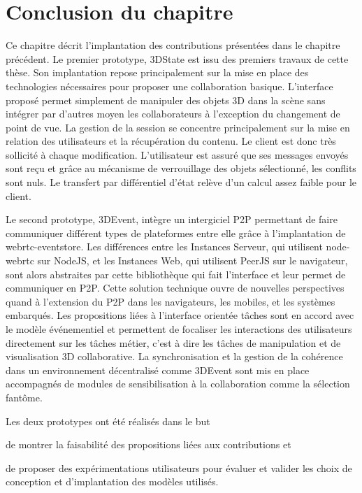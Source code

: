 \section{Conclusion du chapitre}

Ce chapitre décrit l'implantation des contributions présentées dans le chapitre 
précédent.
Le premier prototype, 3DState est issu des premiers travaux de cette thèse. Son 
implantation repose principalement sur la mise en place des technologies 
nécessaires pour proposer une collaboration basique. L'interface proposé permet 
simplement de manipuler des objets 3D dans la scène sans intégrer par d'autres 
moyen les collaborateurs à l'exception du changement de point de vue. La gestion 
de la session se concentre principalement sur la mise en relation des utilisateurs 
et la récupération du contenu. Le client est donc très sollicité à chaque 
modification. L'utilisateur est assuré que ses messages envoyés sont reçu et 
grâce au mécanisme de verrouillage des objets sélectionné, les conflits sont nuls. 
Le transfert par différentiel d'état relève d'un calcul assez faible pour le client.

Le second prototype, 3DEvent, intègre un intergiciel \gls{P2P} permettant de faire 
communiquer différent types de plateformes entre elle grâce à l'implantation de 
webrtc-eventstore. Les différences entre les Instances Serveur, qui utilisent  
node-webrtc sur NodeJS, et les Instances Web, qui utilisent PeerJS sur le 
navigateur, sont alors abstraites par cette bibliothèque qui fait l'interface et leur 
permet de communiquer en \gls{P2P}. Cette solution technique ouvre de nouvelles 
perspectives quand à l'extension du \gls{P2P} dans les navigateurs, les mobiles, 
et les systèmes embarqués. Les propositions liées à l'interface orientée tâches 
sont en accord avec le modèle événementiel et permettent de focaliser les 
interactions des utilisateurs directement sur les tâches métier, c'est à dire les 
tâches de manipulation et de visualisation 3D collaborative. La synchronisation et 
la gestion de la cohérence dans un environnement décentralisé comme 3DEvent 
sont mis en place accompagnés de modules de sensibilisation à la collaboration 
comme la sélection fantôme.

Les deux prototypes ont été réalisés dans le but 
\begin{enumerate*}[label=(\roman*)]
	\item de montrer la faisabilité des 
	propositions liées aux contributions et
	\item de proposer des expérimentations 
	utilisateurs pour évaluer et valider les choix de conception et d'implantation des 
	modèles utilisés.
\end{enumerate*}
%
